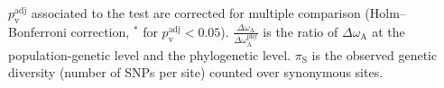 \documentclass{article}
\begin{document}
\begin{table*}[!ht]
{            $p_{\mathrm{v}}^{\mathrm{adj}}$ associated to the test are corrected for multiple comparison (Holm–Bonferroni correction, $^*$ for $p_{\mathrm{v}}^{\mathrm{adj}} < 0.05$).
            $\frac{\Delta\omega_{\mathrm{A}}}{\Delta\omega_{\mathrm{A}}^{\mathrm{phy}}}$ is the ratio of $\Delta \omega_{\mathrm{A}}$ at the population-genetic level and the phylogenetic level.
            $\pi_{\textrm{S}}$ is the observed genetic diversity (number of SNPs per site) counted over synonymous sites.
        }
        \label{table:unfolded-MK}
    \end{table*}
\end{document}
